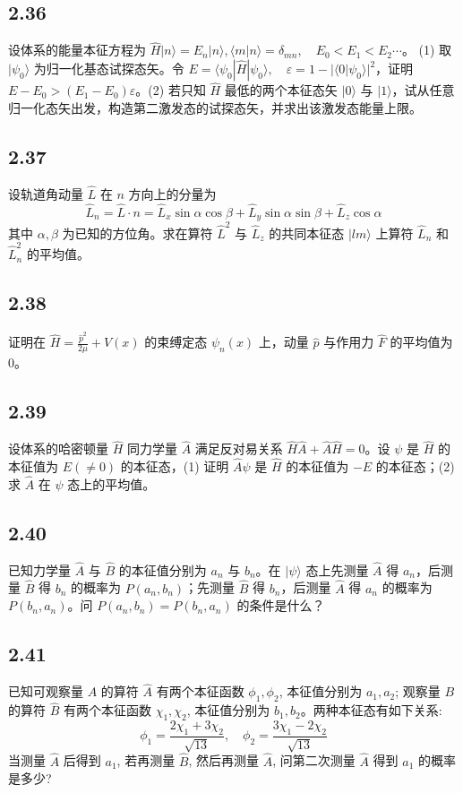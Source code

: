 \subsection{2.36}
设体系的能量本征方程为 $\hat{H} | n \rangle = E_n | n \rangle, \langle m | n \rangle = \delta_{mn}, \quad E_0 < E_1 < E_2 \cdots$。
(1) 取 $| \psi_0 \rangle$ 为归一化基态试探态矢。令 $E = \langle \psi_0 | \hat{H} | \psi_0 \rangle, \quad \varepsilon = 1 - | \langle 0 | \psi_0 \rangle |^2$，证明 $E - E_0 > (E_1 - E_0) \varepsilon$。(2) 若只知 $\hat{H}$ 最低的两个本征态矢 $| 0 \rangle$ 与 $| 1 \rangle$，试从任意归一化态矢出发，构造第二激发态的试探态矢，并求出该激发态能量上限。

\subsection{2.37}
设轨道角动量 $\hat{L}$ 在 $n$ 方向上的分量为
$$\hat{L}_n = \hat{L} \cdot n = \hat{L}_x \sin \alpha \cos \beta + \hat{L}_y \sin \alpha \sin \beta + \hat{L}_z \cos \alpha$$
其中 $\alpha, \beta$ 为已知的方位角。求在算符 $\hat{L}^2$ 与 $\hat{L}_z$ 的共同本征态 $| lm \rangle$ 上算符 $\hat{L}_n$ 和 $\hat{L}_n^2$ 的平均值。

\subsection{2.38}
证明在 $\hat{H} = \frac{\hat{p}^2}{2\mu} + V(x)$ 的束缚定态 $\psi_n (x)$ 上，动量 $\hat{p}$ 与作用力 $\hat{F}$ 的平均值为0。

\subsection{2.39}
设体系的哈密顿量 $\hat{H}$ 同力学量 $\hat{A}$ 满足反对易关系 $\hat{H} \hat{A} + \hat{A} \hat{H} = 0$。设 $\psi$ 是 $\hat{H}$ 的本征值为 $E(\neq 0)$ 的本征态，(1) 证明 $\hat{A} \psi$ 是 $\hat{H}$ 的本征值为 $-E$ 的本征态；(2) 求 $\hat{A}$ 在 $\psi$ 态上的平均值。

\subsection{2.40}
已知力学量 $\hat{A}$ 与 $\hat{B}$ 的本征值分别为 $a_n$ 与 $b_n$。在 $|\psi\rangle$ 态上先测量 $\hat{A}$ 得 $a_n$，后测量 $\hat{B}$ 得 $b_n$ 的概率为 $P(a_n, b_n)$；先测量 $\hat{B}$ 得 $b_n$，后测量 $\hat{A}$ 得 $a_n$ 的概率为 $P(b_n, a_n)$。问 $P(a_n, b_n) = P(b_n, a_n)$ 的条件是什么？

\subsection{2.41}
已知可观察量 $A$ 的算符 $\hat{A}$ 有两个本征函数 $\phi_1, \phi_2$, 本征值分别为 $a_1, a_2$; 观察量 $B$ 的算符 $\hat{B}$ 有两个本征函数 $\chi_1, \chi_2$, 本征值分别为 $b_1, b_2$。两种本征态有如下关系:
$$\phi_1 = \frac{2\chi_1 + 3\chi_2}{\sqrt{13}}, \quad \phi_2 = \frac{3\chi_1 - 2\chi_2}{\sqrt{13}}$$
当测量 $\hat{A}$ 后得到 $a_1$, 若再测量 $\hat{B}$, 然后再测量 $\hat{A}$, 问第二次测量 $\hat{A}$ 得到 $a_1$ 的概率是多少?

